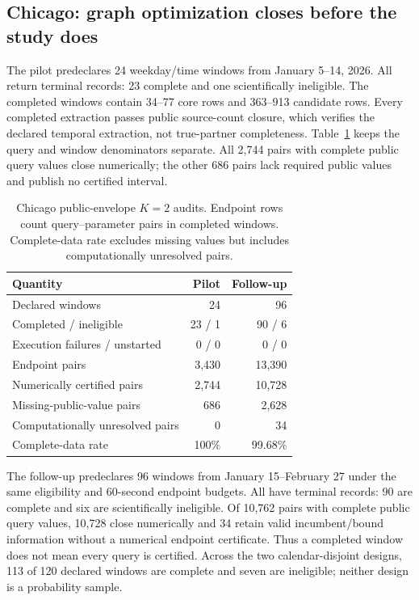 \subsection{Chicago: graph optimization closes before the study does}
The pilot predeclares 24 weekday/time windows from January 5--14, 2026.
All return terminal records: 23 complete and one scientifically ineligible.
The completed windows contain 34--77 core rows and 363--913 candidate rows.
Every completed extraction passes public source-count closure, which verifies
the declared temporal extraction, not true-partner completeness.
Table~\ref{tab:chicagopanel} keeps the query and window denominators separate.
All 2,744 pairs with complete public query values close numerically; the other
686 pairs lack required public values and publish no certified interval.

\begin{table}[t]
\caption{Chicago public-envelope $K=2$ audits. Endpoint rows count query--parameter
pairs in completed windows. Complete-data rate excludes missing values
but includes computationally unresolved pairs.}
\label{tab:chicagopanel}
\centering
\small
\begin{tabular}{@{}lrr@{}}
\toprule
Quantity & Pilot & Follow-up \\
\midrule
Declared windows & 24 & 96 \\
Completed / ineligible & 23 / 1 & 90 / 6 \\
Execution failures / unstarted & 0 / 0 & 0 / 0 \\
Endpoint pairs & 3,430 & 13,390 \\
Numerically certified pairs & 2,744 & 10,728 \\
Missing-public-value pairs & 686 & 2,628 \\
Computationally unresolved pairs & 0 & 34 \\
Complete-data rate & 100\% & 99.68\% \\
\bottomrule
\end{tabular}
\end{table}

The follow-up predeclares 96 windows from January 15--February 27 under the
same eligibility and 60-second endpoint budgets. All have terminal records:
90 are complete and six are scientifically ineligible. Of 10,762 pairs with
complete public query values, 10,728 close numerically and 34 retain valid
incumbent/bound information without a numerical endpoint certificate. Thus a
completed window does not mean every query is certified. Across the two
calendar-disjoint designs, 113 of 120 declared windows are complete and seven
are ineligible; neither design is a probability sample.


